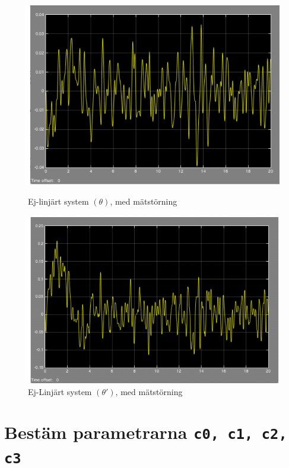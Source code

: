 \documentclass[11pt]{article}
\begin{document}
\begin{figure}[h!]
\centering
\includegraphics[scale=0.9]{Figures/simlink_3}
\caption{Ej-linjärt system $(\theta)$, med mätstörning}
\vspace{3em}
\includegraphics[scale=0.9]{Figures/simlink_4}
\caption{Ej-Linjärt system $(\theta \prime)$, med mätstörning}
\end{figure}
\newpage
\section{Bestäm parametrarna \texttt{c0, c1, c2, c3}}
\end{document}
